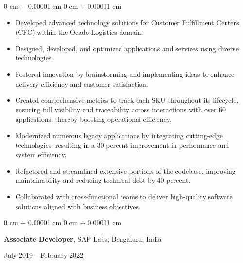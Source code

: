 \documentclass[10pt, letterpaper]{article}
\newenvironment{highlights}{
    \begin{itemize}[
        topsep=0.10 cm,
        parsep=0.10 cm,
        partopsep=0pt,
        itemsep=0pt,
        leftmargin=0 cm + 10pt
    ]
}{
    \end{itemize}
} %
\newenvironment{onecolentry}{
    \begin{adjustwidth}{
        0 cm + 0.00001 cm
    }{
        0 cm + 0.00001 cm
    }
}{
    \end{adjustwidth}
} %
\newenvironment{twocolentry}[2][]{
    \onecolentry
    \def\secondColumn{#2}
    \setcolumnwidth{\fill, 4.5 cm}
    \begin{paracol}{2}
}{
    \switchcolumn \raggedleft \secondColumn
    \end{paracol}
    \endonecolentry
} %
\begin{document}
        \vspace{0.10 cm}
        \begin{onecolentry}
            \begin{highlights}
                \item Developed advanced technology solutions for Customer Fulfillment Centers (CFC) within the Ocado Logistics domain.
                \item Designed, developed, and optimized applications and services using diverse technologies.
                \item Fostered innovation by brainstorming and implementing ideas to enhance delivery efficiency and customer satisfaction.
                \item Created comprehensive metrics to track each SKU throughout its lifecycle, ensuring full visibility and traceability across interactions with over 60 applications, thereby boosting operational efficiency.
                \item Modernized numerous legacy applications by integrating cutting-edge technologies, resulting in a 30 percent improvement in performance and system efficiency.
                \item Refactored and streamlined extensive portions of the codebase, improving maintainability and reducing technical debt by 40 percent.
                \item Collaborated with cross-functional teams to deliver high-quality software solutions aligned with business objectives.
            \end{highlights}
        \end{onecolentry}


        \vspace{0.2 cm}

        \begin{twocolentry}{
            July 2019 – February 2022
        }
            \textbf{Associate Developer}, SAP Labs, Bengaluru, India
        \end{twocolentry}
\end{document}
